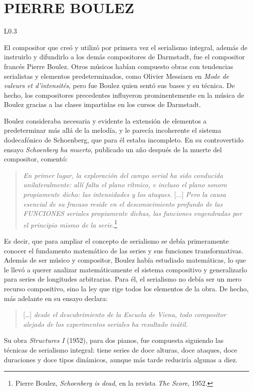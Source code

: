 	\section{PIERRE BOULEZ}
	\label{boulez}
     \begin{wrapfigure}{L}{0.3\textwidth}
		\captionsetup{justification=centering, font=footnotesize}
		\vspace{-0.5cm}
	\end{wrapfigure}
    El compositor que creó y utilizó por primera vez el serialismo integral, además de instruirlo y difundirlo a los demás compositores de Darmstadt, fue el compositor francés Pierre Boulez. Otros músicos habían compuesto obras con tendencias serialistas y elementos predeterminados, como Olivier Messiaen en \emph{Mode de valeurs et d’intensités}, pero fue Boulez quien sentó sus bases y su técnica. De hecho, los compositores precedentes influyeron prominentemente en la música de Boulez gracias a las clases impartidas en los cursos de Darmstadt.
    
    Boulez consideraba necesaria y evidente la extensión de elementos a predeterminar más allá de la melodía, y le parecía incoherente el sistema dodecafónico de Schoenberg, que para él estaba incompleto. En su controvertido ensayo \emph{Schoenberg ha muerto}, publicado un año después de la muerte del compositor, comentó:
    
    \begin{quote}\emph{En primer lugar, la exploración del campo serial ha sido conducida unilateralmente: allí falta el plano rítmico, e incluso el plano sonoro propiamente dicho: las intensidades y los ataques.} [$\ldots$] \emph{Pero la causa esencial de su fracaso reside en el desconocimiento profundo de las FUNCIONES seriales propiamente dichas, las funciones engendradas por el principio mismo de la serie.}\footnote{Pierre Boulez, \emph{Schoenberg is dead}, en la revista \emph{The Score}, 1952.}\end{quote}
    
   Es decir, que para ampliar el concepto de serialismo se debía primeramente conocer el fundamento matemático de las series y sus funciones transformativas. Además de ser músico y compositor, Boulez había estudiado matemáticas, lo que le llevó a querer analizar matemáticamente el sistema compositivo y generalizarlo para series de longitudes arbitrarias. Para él, el serialismo no debía ser un mero recurso compositivo, sino la ley que rige todos los elementos de la obra. De hecho, más adelante en su ensayo declara:
    
    \begin{quote}[\ldots] \emph{desde el descubrimiento de la Escuela de Viena, todo compositor alejado de los experimentos seriales ha resultado inútil.}\end{quote}

	Su obra \emph{Structures I} (1952), para dos pianos, fue compuesta siguiendo las técnicas de serialismo integral: tiene series de doce alturas, doce ataques, doce duraciones y
doce tipos dinámicos, aunque más tarde reduciría algunas a diez.